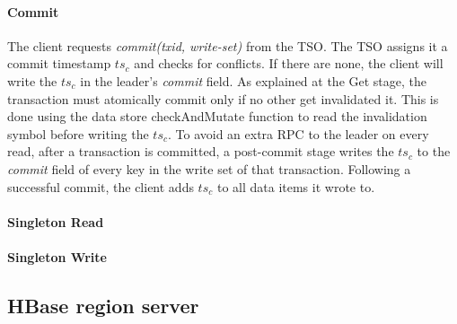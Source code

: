\paragraph{Commit}
The client requests \emph{commit(txid, write-set)} from the TSO. The TSO assigns it a commit timestamp $ts_c$ and checks for conflicts. If there are none, the client will write the $ts_c$ in the leader's \emph{commit} field. As explained at the Get stage, the transaction must atomically commit only if no other get invalidated it. This is done using the data store checkAndMutate function to read the invalidation symbol before writing the $ts_c$.
To avoid an extra RPC to the leader on every read, after a transaction is committed, a post-commit stage writes the $ts_c$ to the \emph{commit} field of every key in the write set of that transaction. 
Following a successful commit, the client adds $ts_c$ to all data items it wrote to.

\paragraph{Singleton Read}
\paragraph{Singleton Write}



\subsection{HBase region server}
\label{ssec:hbase}
